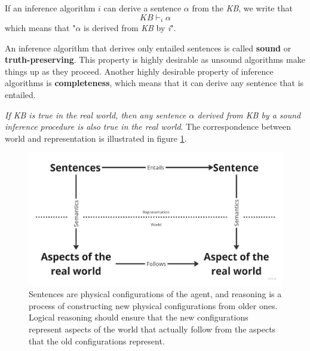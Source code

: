 \documentclass{article}
\begin{document}
If an inference algorithm $i$ can derive a sentence $\alpha$ from the \textit{KB}, we write that
    $$KB \vdash_i\alpha$$
which means that "$\alpha$ is derived from \textit{KB} by \textit{i}".

An inference algorithm that derives only entailed sentences is called \textbf{sound} or \textbf{truth-preserving}. This property is highly desirable as unsound algorithms make things up as they proceed. 
Another highly desirable property of inference algorithms is \textbf{completeness}, which means that it can derive any sentence that is entailed.

\textit{If KB is true in the real world, then any sentence $\alpha$ derived from KB by a sound inference procedure is also true in the real world}. The correspondence between world and representation is illustrated in figure \ref{fig:representation_v_real_world}.

\begin{figure}[h]
    \centering
    \includegraphics[width=0.5\linewidth]{images/Representation and Real World.png}
    \caption{Sentences are physical configurations of the agent, and reasoning is a process of constructing new physical configurations from older ones. Logical reasoning should ensure that the new configurations represent aspects of the world that actually follow from the aspects that the old configurations represent.}
    \label{fig:representation_v_real_world}
\end{figure}
\end{document}

